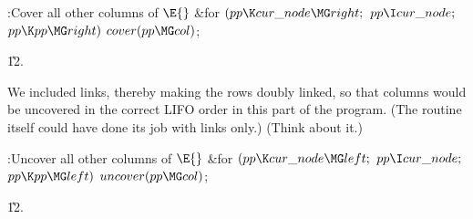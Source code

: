 \B{}:Cover all other columns of \X${}%
\E{}$\6
\&{for} ${}(\\{pp}\K\\{cur\_node}\MG\\{right};{}$ ${}\\{pp}\I\\{cur\_node};{}$
${}\\{pp}\K\\{pp}\MG\\{right}){}$\1\5
${}\\{cover}(\\{pp}\MG\\{col}){}$;\2\par
\U12.\fi

We included  links, thereby making the rows
doubly linked, so
that columns would be uncovered in the correct LIFO order in this
part of the program. (The  routine itself could have done its
job with  links only.) (Think about it.)

\Y\B\4:Uncover all other columns of \X${}\E{}$\6
\&{for} ${}(\\{pp}\K\\{cur\_node}\MG\\{left};{}$ ${}\\{pp}\I\\{cur\_node};{}$
${}\\{pp}\K\\{pp}\MG\\{left}){}$\1\5
${}\\{uncover}(\\{pp}\MG\\{col}){}$;\2\par
\U12.\fi

